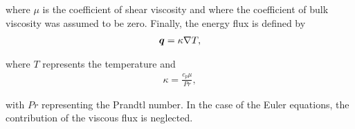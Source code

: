 where $\mu$ is the coefficient of shear viscosity  and where the coefficient of bulk viscosity was assumed to be zero. Finally, the energy flux is defined by
\begin{align*}
\varv{q} = \kappa \nabla T,
\end{align*}

where $T$ represents the temperature and
\begin{align*}
\kappa = \frac{c_p \mu}{Pr},
\end{align*}

with $Pr$ representing the Prandtl number. In the case of the Euler equations, the contribution of the viscous flux is neglected. 
